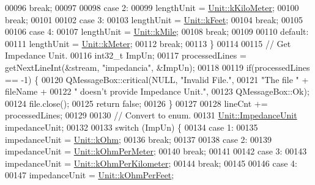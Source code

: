 \begin{DoxyCode}
00096     \textcolor{keywordflow}{break};
00097 
00098   \textcolor{keywordflow}{case} 2:
00099     lengthUnit = \hyperlink{class_unit_a8c8921f7b225ad6063b1cb573425b9a0a1c04f3dd196dbe1832a2658215b0d919}{Unit::kKiloMeter};
00100     \textcolor{keywordflow}{break};
00101 
00102   \textcolor{keywordflow}{case} 3:
00103     lengthUnit = \hyperlink{class_unit_a8c8921f7b225ad6063b1cb573425b9a0a9ac9b167b0ebce477fb53d6ace04ddc8}{Unit::kFeet};
00104     \textcolor{keywordflow}{break};
00105 
00106   \textcolor{keywordflow}{case} 4:
00107     lengthUnit = \hyperlink{class_unit_a8c8921f7b225ad6063b1cb573425b9a0a2ebde742068bbee0510de32fbb4cd724}{Unit::kMile};
00108     \textcolor{keywordflow}{break};
00109 
00110   \textcolor{keywordflow}{default}:
00111     lengthUnit = \hyperlink{class_unit_a8c8921f7b225ad6063b1cb573425b9a0abfa41ebe7ee649a1f02c9b8ae570434b}{Unit::kMeter};
00112     \textcolor{keywordflow}{break};
00113   \}
00114 
00115   \textcolor{comment}{// Get Impedance Unit.}
00116   int32\_t ImpUn;
00117   processedLines = getNextLineInt(&stream, \textcolor{stringliteral}{"impedancia"}, &ImpUn);
00118 
00119   \textcolor{keywordflow}{if}(processedLines == -1) \{
00120     QMessageBox::critical(NULL, \textcolor{stringliteral}{"Invalid File."},
00121                           \textcolor{stringliteral}{"The file "} + fileName +
00122                           \textcolor{stringliteral}{" doesn't provide Impedance Unit."},
00123                           QMessageBox::Ok);
00124     file.close();
00125     \textcolor{keywordflow}{return} \textcolor{keyword}{false};
00126   \}
00127 
00128   lineCnt += processedLines;
00129 
00130 \textcolor{comment}{// Convert to enum.}
00131   \hyperlink{class_unit_a3747e779c805df24a71961290be3fbdf}{Unit::ImpedanceUnit} impedanceUnit;
00132 
00133   \textcolor{keywordflow}{switch} (ImpUn) \{
00134   \textcolor{keywordflow}{case} 1:
00135     impedanceUnit = \hyperlink{class_unit_a3747e779c805df24a71961290be3fbdfa6b9c74d1763eefbaf751eeecff0bd9da}{Unit::kOhm};
00136     \textcolor{keywordflow}{break};
00137 
00138   \textcolor{keywordflow}{case} 2:
00139     impedanceUnit = \hyperlink{class_unit_a3747e779c805df24a71961290be3fbdfa35e9ca44deb5a35fdb576111cf0db336}{Unit::kOhmPerMeter};
00140     \textcolor{keywordflow}{break};
00141 
00142   \textcolor{keywordflow}{case} 3:
00143     impedanceUnit = \hyperlink{class_unit_a3747e779c805df24a71961290be3fbdfa56a0289d2ddeff7ca4aa8ba410df79d6}{Unit::kOhmPerKilometer};
00144     \textcolor{keywordflow}{break};
00145 
00146   \textcolor{keywordflow}{case} 4:
00147     impedanceUnit = \hyperlink{class_unit_a3747e779c805df24a71961290be3fbdfa433b57934ca3be960ec7a60f3ea6ea87}{Unit::kOhmPerFeet};

\end{DoxyCode}
